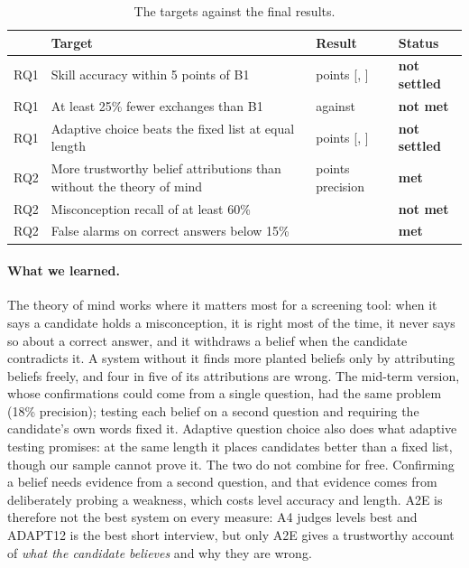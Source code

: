 \documentclass[10pt,a4paper]{article}
\newcommand{\pass}{\textcolor[HTML]{0a7d0a}{\textbf{met}}}
\newcommand{\fail}{\textcolor[HTML]{b02f2f}{\textbf{not met}}}
\newcommand{\open}{\textcolor[HTML]{8a6d00}{\textbf{not settled}}}
\newcommand{\ci}[2]{{\small[#1, #2]}}
\begin{document}
\begin{table}[h]
\centering\small
\begin{tabularx}{\linewidth}{@{}lXll@{}}
\toprule
& Target & Result & Status \\
\midrule
RQ1 & Skill accuracy within 5 points of B1 & \fFullVsFixedSkillAccuracyDiff{} points \ci{\fFullVsFixedSkillAccuracyLow}{\fFullVsFixedSkillAccuracyHigh} & \open \\
RQ1 & At least 25\% fewer exchanges than B1 & \fExchFull{} against \fExchBOne{} & \fail \\
RQ1 & Adaptive choice beats the fixed list at equal length & \fAdaptVsFixedSkillAccuracyDiff{} points \ci{\fAdaptVsFixedSkillAccuracyLow}{\fAdaptVsFixedSkillAccuracyHigh} & \open \\
RQ2 & More trustworthy belief attributions than without the theory of mind & \fFullVsAfourPrecisionDiff{} points precision & \pass \\
RQ2 & Misconception recall of at least 60\% & \fRecallFull{} & \fail \\
RQ2 & False alarms on correct answers below 15\% & \fFalseAlarmFull{} & \pass \\
\bottomrule
\end{tabularx}
\caption{The targets against the final results.}
\label{tab:targets}
\end{table}

\paragraph{What we learned.} The theory of mind works where it matters most for a screening tool:
when it says a candidate holds a misconception, it is right most of the time, it never says so about
a correct answer, and it withdraws a belief when the candidate contradicts it. A system without it
finds more planted beliefs only by attributing beliefs freely, and four in five of its attributions
are wrong. The mid-term version, whose confirmations could come from a single question, had the same
problem (18\% precision); testing each belief on a second question and requiring the candidate's own
words fixed it. Adaptive question choice also does what adaptive testing promises: at the same length
it places candidates better than a fixed list, though our sample cannot prove it. The two do not
combine for free. Confirming a belief needs evidence from a second question,
and that evidence comes from deliberately probing a weakness, which costs level accuracy and length.
A2E is therefore not the best system on every measure: A4 judges levels best and ADAPT12 is the
best short interview, but only A2E gives a trustworthy account of \emph{what the candidate believes}
and why they are wrong.
\end{document}
